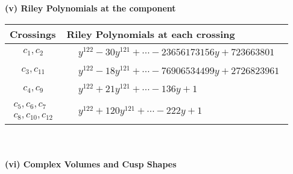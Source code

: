 \documentclass[1p]{elsarticle_modified}
\theoremstyle{definition}
\begin{document}
\newpage\renewcommand{\arraystretch}{1}
\flushleft \textbf{(v) Riley Polynomials at the component}\newline \\
\begin{tabular}{m{50pt}|m{274pt}}
Crossings & \hspace{64pt}Riley Polynomials at each crossing \\
\hline $$\begin{aligned}c_{1},c_{2}\end{aligned}$$&$\begin{aligned}
&y^{122}-30 y^{121}+\cdots-23656173156 y+723663801
\end{aligned}$\\
\hline $$\begin{aligned}c_{3},c_{11}\end{aligned}$$&$\begin{aligned}
&y^{122}-18 y^{121}+\cdots-76906534499 y+2726823961
\end{aligned}$\\
\hline $$\begin{aligned}c_{4},c_{9}\end{aligned}$$&$\begin{aligned}
&y^{122}+21 y^{121}+\cdots-136 y+1
\end{aligned}$\\
\hline $$\begin{aligned}c_{5},c_{6},c_{7}\\c_{8},c_{10},c_{12}\end{aligned}$$&$\begin{aligned}
&y^{122}+120 y^{121}+\cdots-222 y+1
\end{aligned}$\\
\hline
\end{tabular}\\~\\
\newpage\flushleft \textbf{(vi) Complex Volumes and Cusp Shapes}
\end{document}
